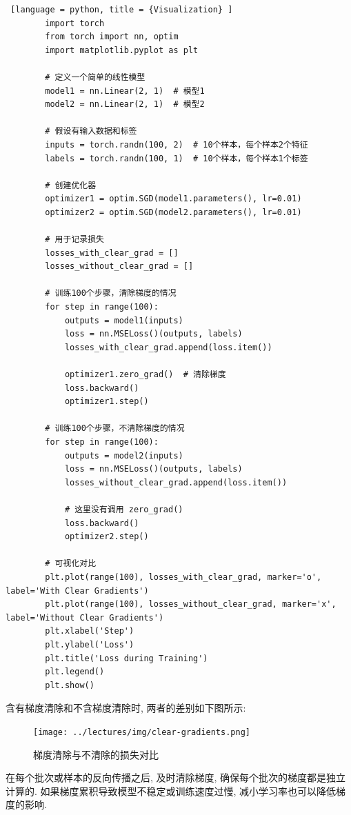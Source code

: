 \documentclass[printMode=false, declarePage=false]{ecnuthesis}
\begin{document}
    \begin{lstlisting} [language = python, title = {Visualization} ]
        import torch
        from torch import nn, optim
        import matplotlib.pyplot as plt

        # 定义一个简单的线性模型
        model1 = nn.Linear(2, 1)  # 模型1
        model2 = nn.Linear(2, 1)  # 模型2

        # 假设有输入数据和标签
        inputs = torch.randn(100, 2)  # 10个样本，每个样本2个特征
        labels = torch.randn(100, 1)  # 10个样本，每个样本1个标签

        # 创建优化器
        optimizer1 = optim.SGD(model1.parameters(), lr=0.01)
        optimizer2 = optim.SGD(model2.parameters(), lr=0.01)

        # 用于记录损失
        losses_with_clear_grad = []
        losses_without_clear_grad = []

        # 训练100个步骤，清除梯度的情况
        for step in range(100):
            outputs = model1(inputs)
            loss = nn.MSELoss()(outputs, labels)
            losses_with_clear_grad.append(loss.item())

            optimizer1.zero_grad()  # 清除梯度
            loss.backward()
            optimizer1.step()

        # 训练100个步骤，不清除梯度的情况
        for step in range(100):
            outputs = model2(inputs)
            loss = nn.MSELoss()(outputs, labels)
            losses_without_clear_grad.append(loss.item())

            # 这里没有调用 zero_grad()
            loss.backward()
            optimizer2.step()

        # 可视化对比
        plt.plot(range(100), losses_with_clear_grad, marker='o', label='With Clear Gradients')
        plt.plot(range(100), losses_without_clear_grad, marker='x', label='Without Clear Gradients')
        plt.xlabel('Step')
        plt.ylabel('Loss')
        plt.title('Loss during Training')
        plt.legend()
        plt.show()
    \end{lstlisting}

    含有梯度清除和不含梯度清除时, 两者的差别如下图所示:

    \begin{figure} [H]
        \centering
        \texttt{[image: ../lectures/img/clear-gradients.png]}
        \caption{梯度清除与不清除的损失对比}
    \end{figure}

    在每个批次或样本的反向传播之后, 及时清除梯度, 确保每个批次的梯度都是独立计算的.
    如果梯度累积导致模型不稳定或训练速度过慢, 减小学习率也可以降低梯度的影响.
\end{document}

